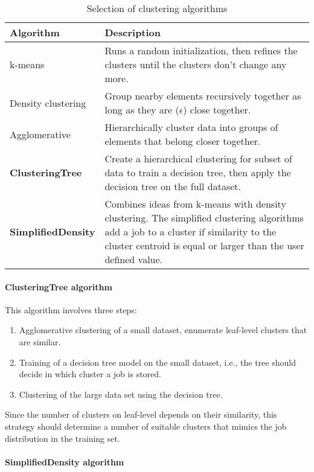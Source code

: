 \documentclass{jhps}
\begin{document}
\begin{table}
  \centering
  \begin{tabularx}{\textwidth}{lX}
    Algorithm & Description \\
    \hline
    k-means & Runs a random initialization, then refines the clusters until the clusters don't change any more.\\
    \hline
    Density clustering &  Group nearby elements recursively together as long as they are ($\epsilon$) close together.\\
    \hline
    Agglomerative &  Hierarchically cluster data into groups of elements that belong closer together.\\
    \hline
    \textbf{ClusteringTree} &  Create a hierarchical clustering for subset of data to train a decision tree, then apply the decision tree on the full dataset.\\
    \hline
    \textbf{SimplifiedDensity} &  Combines ideas from k-means with density clustering.
The simplified clustering algorithms add a job to a cluster if similarity to the cluster centroid is equal or larger than the user defined value.\\
    \hline
  \end{tabularx}
  \caption{Selection of clustering algorithms}
  \label{tab:clustering_algorithms}
\end{table}
\paragraph{ClusteringTree algorithm}
This algorithm involves three steps:

\begin{enumerate}
 \item Agglomerative clustering of a small dataset, enumerate leaf-level clusters that are similar.
 \item Training of a decision tree model on the small dataset, i.e., the tree should decide in which cluster a job is stored.
 \item Clustering of the large data set using the decision tree.
\end{enumerate}

Since the number of clusters on leaf-level depends on their similarity, this strategy should determine a number of suitable clusters that mimics the job distribution in the training set.

\paragraph{SimplifiedDensity algorithm}
\end{document}
